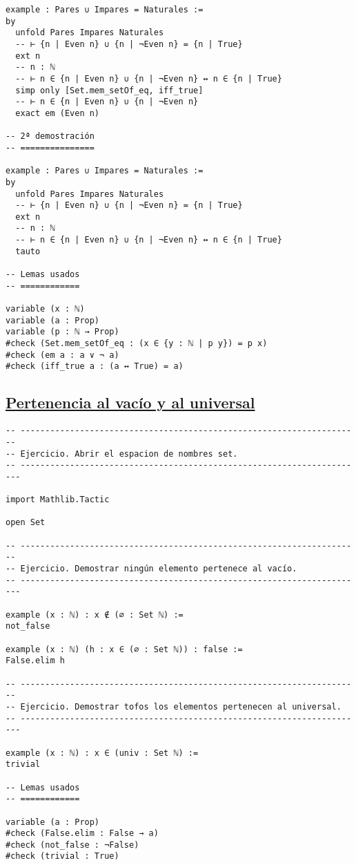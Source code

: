 \begin{verbatim}
example : Pares ∪ Impares = Naturales :=
by
  unfold Pares Impares Naturales
  -- ⊢ {n | Even n} ∪ {n | ¬Even n} = {n | True}
  ext n
  -- n : ℕ
  -- ⊢ n ∈ {n | Even n} ∪ {n | ¬Even n} ↔ n ∈ {n | True}
  simp only [Set.mem_setOf_eq, iff_true]
  -- ⊢ n ∈ {n | Even n} ∪ {n | ¬Even n}
  exact em (Even n)

-- 2ª demostración
-- ===============

example : Pares ∪ Impares = Naturales :=
by
  unfold Pares Impares Naturales
  -- ⊢ {n | Even n} ∪ {n | ¬Even n} = {n | True}
  ext n
  -- n : ℕ
  -- ⊢ n ∈ {n | Even n} ∪ {n | ¬Even n} ↔ n ∈ {n | True}
  tauto

-- Lemas usados
-- ============

variable (x : ℕ)
variable (a : Prop)
variable (p : ℕ → Prop)
#check (Set.mem_setOf_eq : (x ∈ {y : ℕ | p y}) = p x)
#check (em a : a ∨ ¬ a)
#check (iff_true a : (a ↔ True) = a)
\end{verbatim}

\subsection{\href{./src/Conjuntos/Pertenencia\_al\_vacio\_y\_al\_universal.lean}{Pertenencia al vacío y al universal}}
\label{sec:orgc3aefdb}
\begin{verbatim}
-- ---------------------------------------------------------------------
-- Ejercicio. Abrir el espacion de nombres set.
-- ----------------------------------------------------------------------

import Mathlib.Tactic

open Set

-- ---------------------------------------------------------------------
-- Ejercicio. Demostrar ningún elemento pertenece al vacío.
-- ----------------------------------------------------------------------

example (x : ℕ) : x ∉ (∅ : Set ℕ) :=
not_false

example (x : ℕ) (h : x ∈ (∅ : Set ℕ)) : false :=
False.elim h

-- ---------------------------------------------------------------------
-- Ejercicio. Demostrar tofos los elementos pertenecen al universal.
-- ----------------------------------------------------------------------

example (x : ℕ) : x ∈ (univ : Set ℕ) :=
trivial

-- Lemas usados
-- ============

variable (a : Prop)
#check (False.elim : False → a)
#check (not_false : ¬False)
#check (trivial : True)
\end{verbatim}

